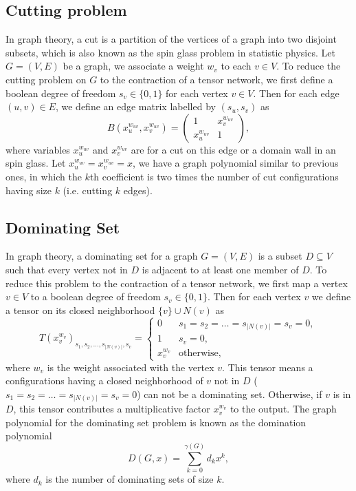 \documentclass[onefignum, onetabnum]{siamart190516}
\newcommand{\<}{\langle}
\renewcommand{\>}{\rangle}
\begin{document}
\subsection{Cutting problem}
In graph theory, a cut is a partition of the vertices of a graph into two disjoint subsets,
which is also known as the spin glass problem in statistic physics.
Let $G=(V,E)$ be a graph, we associate a weight $w_v$ to each $v\in V$. To reduce the cutting problem on $G$ to the contraction of a tensor network, we first define a boolean degree of freedom $s_v\in\{0, 1\}$ for each vertex $v\in V$.
Then for each edge $(u,v)\in E$, we define an edge matrix labelled by $(s_u, s_v)$ as
\begin{equation}
    B(x^{w_{uv}}_u, x^{w_{uv}}_v) = \left(\begin{matrix}
        1 & x_{v}^{w_{uv}}\\
        x_{u}^{w_{uv}} & 1
    \end{matrix}\right),
\end{equation}
where variables $x_u^{w_{uv}}$ and $x_v^{w_{uv}}$ are for a cut on this edge or a domain wall in an spin glass.
Let $x_u^{w_{uv}} = x_v^{w_{uv}} = x$, we have a graph polynomial similar to previous ones,
in which the $k$th coefficient is two times the number of cut configurations having size $k$ (i.e. cutting $k$ edges).

\subsection{Dominating Set}
In graph theory, a dominating set for a graph $G = (V, E)$ is a subset $D \subseteq V$ such that every vertex not in $D$ is adjacent to at least one member of $D$.
To reduce this problem to the contraction of a tensor network, we first map a vertex $v\in V$ to a boolean degree of freedom $s_v\in\{0, 1\}$.
Then for each vertex $v$ we define a tensor on its closed neighborhood $\{v\} \cup N(v)$ as
\begin{equation}
T(x^{w_v}_v)_{s_1,s_2,\ldots,s_{|N(v)|},s_v} = \begin{cases}
    0 & s_1=s_2=\ldots=s_{|N(v)|}=s_v=0,\\
    1 & s_v=0,\\
    x^{w_v}_v & \text{otherwise},
\end{cases}
\end{equation}
where $w_v$ is the weight associated with the vertex $v$.
This tensor means a configurations having a closed neighborhood of $v$ not in $D$ ($s_1=s_2=\ldots=s_{|N(v)|}=s_v=0$) can not be a dominating set.
Otherwise, if $v$ is in $D$, this tensor contributes a multiplicative factor $x_v^{w_v}$ to the output.
The graph polynomial for the dominating set problem is known as the domination polynomial~\cite{Alikhani2009}
\begin{equation}
D(G, x) = \sum_{k=0}^{\gamma(G)} d_k x^k,
\end{equation}
where $d_k$ is the number of dominating sets of size $k$.
\end{document}
